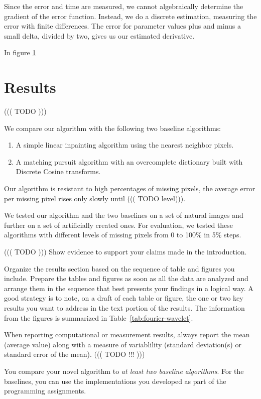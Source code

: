 \documentclass[10pt,conference,compsocconf]{IEEEtran}
\begin{document}
Since the error and time are measured, we cannot algebraically determine the gradient of the error function. Instead, we do a discrete estimation,
measuring the error with finite differences. The error for parameter values plus and minus a small delta, divided by two, gives us our estimated
derivative.

In figure \ref{}

\section{Results}

 ((( TODO )))
 
 We compare our algorithm with the following two baseline algorithms:
 \begin{enumerate}
	 \item A simple linear inpainting algorithm using the nearest neighbor pixels.
	 \item A matching pursuit algorithm \cite{matchingpursuit93} with an overcomplete dictionary built with Discrete Cosine transforms.
 \end{enumerate}
 
  Our algorithm is resistant to high percentages of missing pixels, the average error per missing pixel rises only slowly until ((( TODO level))). 
 
We tested our algorithm and the two baselines on a set of natural images and further on a set of artificially created ones. 
For evaluation, we tested these algorithms with different levels of missing pixels from 0 to 100\% in 5\% steps.


  
 ((( TODO )))
  Show evidence to support your claims made in the
  introduction. 
  
Organize the results section based on the sequence of table and
figures you include. Prepare the tables and figures as soon as all
the data are analyzed and arrange them in the sequence that best
presents your findings in a logical way. A good strategy is to note,
on a draft of each table or figure, the one or two key results you
want to address in the text portion of the results.
The information from the figures is
summarized in Table~\ref{tab:fourier-wavelet}.

When reporting computational or measurement results, always
report the mean (average value) along with a measure of variablility
(standard deviation(s) or standard error of the mean). ((( TODO !!! )))

You compare your novel algorithm to \emph{at least two baseline
  algorithms}. For the baselines, you can use the implementations you
developed as part of the programming assignments.
\end{document}
